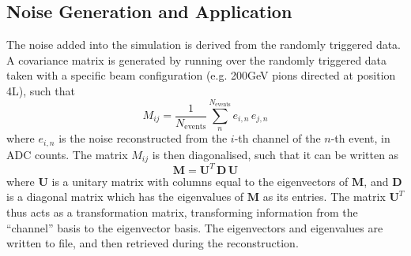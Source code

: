 \subsection{Noise Generation and Application}


%
%


The noise added into the simulation is derived from the randomly triggered data. A covariance matrix is generated by running over the randomly triggered data taken with a specific beam configuration (e.g. 200GeV pions directed at position 4L), such that 
\begin{equation}
M_{ij} = \frac{1}{N_\mathrm{events}}\sum_n^{N_\mathrm{events}} e_{i,n} \, e_{j,n}
\end{equation}
where $e_{i,n}$ is the noise reconstructed from the $i$-th channel of the $n$-th event, in ADC counts. The matrix $M_{ij}$ is then diagonalised, such that it can be written as
\begin{equation}
\mathbf{M} = \mathbf{U}^T \, \mathbf{D} \, \mathbf{U}
\end{equation}
where $\mathbf{U}$ is a unitary matrix with columns equal to the eigenvectors of $\mathbf{M}$, and $\mathbf{D}$ is a diagonal matrix which has the eigenvalues of $\mathbf{M}$ as its entries. The matrix $\mathbf{U}^T$ thus acts as a transformation matrix, transforming information from the ``channel'' basis to the eigenvector basis. The eigenvectors and eigenvalues are written to file, and then retrieved during the reconstruction.

